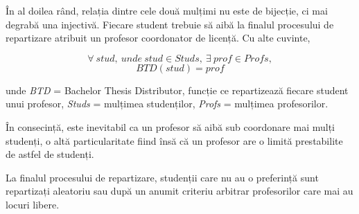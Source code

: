 În al doilea rând, relația dintre cele două mulțimi nu este de bijecție, ci mai degrabă una injectivă. Fiecare student trebuie să aibă la finalul procesului de repartizare atribuit un profesor coordonator de licență. Cu alte cuvinte,

\[\forall \: stud,\: unde\: stud \in Studs,\: \exists \: prof \in Profs,\] 
\[BTD(stud)=prof\]

unde \textit{BTD} = Bachelor Thesis Distributor, funcție ce repartizează fiecare student unui profesor, \textit{Studs} = mulțimea studenților, \textit{Profs} = mulțimea profesorilor.

În consecință, este inevitabil ca un profesor să aibă sub coordonare mai mulți studenți, o altă particularitate fiind însă că un profesor are o limită prestabilite de astfel de studenți.

La finalul procesului de repartizare, studenții care nu au o preferință sunt repartizați aleatoriu sau după un anumit criteriu arbitrar profesorilor care mai au locuri libere.